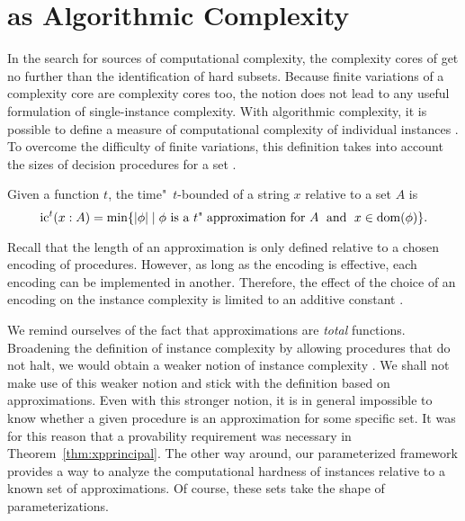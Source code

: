 \section{as Algorithmic Complexity}

In the search for sources of computational complexity, the complexity cores of \citeauthor{lynch1975reducibility} get no further than the identification of hard subsets.
Because finite variations of a complexity core are complexity cores too, the notion does not lead to any useful formulation of single-instance complexity.
With algorithmic complexity, it is possible to define a measure of computational complexity of individual instances \parencite{li2008introduction}.
To overcome the difficulty of finite variations, this definition takes into account the sizes of decision procedures for a set \parencite{ko1986hard,orponen1994instance}.
\begin{definition}
  Given a function $t$, the time"~$t$-bounded  of a string $x$ relative to a set $A$ is
  \begin{equation*}
    \operatorname{ic}^t(x : A) = \min\{{\lvert\phi\rvert} \;|\; \text{$\phi$ is a $t$"~approximation for $A$} \;\text{ and }\; x \in \operatorname{dom}(\phi)\}.
  \end{equation*}
\end{definition}

Recall that the length of an approximation is only defined relative to a chosen encoding of procedures.
However, as long as the encoding is effective, each encoding can be implemented in another.
Therefore, the effect of the choice of an encoding on the instance complexity is limited to an additive constant \parencite{orponen1994instance,li2008introduction}.

We remind ourselves of the fact that approximations are \emph{total} functions.
Broadening the definition of instance complexity by allowing procedures that do not halt, we would obtain a weaker notion of instance complexity \parencite{kummer1996kolmogorov}.
We shall not make use of this weaker notion and stick with the definition based on approximations.
Even with this stronger notion, it is in general impossible to know whether a given procedure is an approximation for some specific set.
It was for this reason that a provability requirement was necessary in Theorem~\ref{thm:xpprincipal}.
The other way around, our parameterized framework provides a way to analyze the computational hardness of instances relative to a known set of approximations.
Of course, these sets take the shape of parameterizations.

